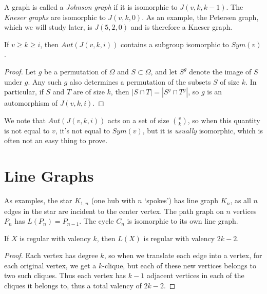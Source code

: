 A graph is called a \textit{Johnson graph} if it is isomorphic to $J(v,k,k-1)$.  The \textit{Kneser graphs} are isomorphic to $J(v,k,0)$.  As an example, the Petersen graph, which we will study later, is $J(5,2,0)$ and is therefore a Kneser graph.

\begin{lemma}
	{If $v\geq k \geq i$, then $Aut(J(v,k,i))$ contains a subgroup isomorphic to $Sym(v)$.}
\end{lemma}

\begin{proof}
	Let $g$ be a permutation of $\Omega$ and $S\subset \Omega$, and let $S^g$ denote the image of $S$ under $g$.  Any such $g$ also determines a permutation of the subsets $S$ of size $k$.  In particular, if $S$ and $T$ are of size $k$, then $|S\cap T|=|S^g\cap T^g|$, so $g$ is an automorphism of $J(v,k,i)$.
\end{proof}

We note that $Aut(J(v,k,i))$ acts on a set of size $\binom{v}{k}$, so when this quantity is not equal to $v$, it's not equal to $Sym(v)$, but it is \textit{usually} isomorphic, which is often not an easy thing to prove.


\section*{Line Graphs}


As examples, the star $K_{1,n}$ (one hub with $n$ `spokes') has line graph $K_n$, as all $n$ edges in the star are incident to the center vertex.  The path graph on $n$ vertices $P_n$ has $L(P_n)=P_{n-1}$.  The cycle $C_n$ is isomorphic to its own line graph.

\begin{lemma}
{If $X$ is regular with valency $k$, then $L(X)$ is regular with valency $2k-2$.}
\end{lemma}
\begin{proof}
	Each vertex has degree $k$, so when we translate each edge into a vertex, for each original vertex, we get a $k$-clique, but each of these new vertices belongs to two such cliques.  Thus each vertex has $k-1$ adjacent vertices in each of the cliques it belongs to, thus a total valency of $2k-2$.
\end{proof}



